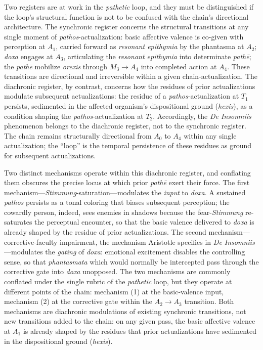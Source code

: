 Two registers are at work in the \textit{pathetic} loop, and they must be distinguished if the loop's structural function is not to be confused with the chain's directional architecture. The synchronic register concerns the structural transitions at any single moment of \textit{pathos}-actualization: basic affective valence is co-given with perception at $A_1$, carried forward as \textit{resonant epithymia} by the phantasma at $A_2$; \textit{doxa} engages at $A_3$, articulating the \textit{resonant epithymia} into determinate \textit{pathē}; the \textit{pathē} mobilize \textit{orexis} through $M_3 \rightarrow A_4$ into completed action at $A_4$. These transitions are directional and irreversible within a given chain-actualization. The diachronic register, by contrast, concerns how the residues of prior actualizations modulate subsequent actualizations: the residue of a \textit{pathos}-actualization at $T_1$ persists, sedimented in the affected organism's dispositional ground (\textit{hexis}), as a condition shaping the \textit{pathos}-actualization at $T_2$. Accordingly, the \textit{De Insomniis} phenomenon belongs to the diachronic register, not to the synchronic register. The chain remains structurally directional from $A_0$ to $A_4$ within any single actualization; the ``loop'' is the temporal persistence of these residues as ground for subsequent actualizations.

Two distinct mechanisms operate within this diachronic register, and conflating them obscures the precise locus at which prior \textit{pathē} exert their force. The first mechanism---\textit{Stimmung}-saturation---modulates the \textit{input} to \textit{doxa}. A sustained \textit{pathos} persists as a tonal coloring that biases subsequent perception; the cowardly person, indeed, sees enemies in shadows because the fear-\textit{Stimmung} re-saturates the perceptual encounter, so that the basic valence delivered to \textit{doxa} is already shaped by the residue of prior actualizations. The second mechanism---corrective-faculty impairment, the mechanism Aristotle specifies in \textit{De Insomniis}---modulates the \textit{gating} of \textit{doxa}: emotional excitement disables the controlling sense, so that \textit{phantasmata} which would normally be intercepted pass through the corrective gate into \textit{doxa} unopposed. The two mechanisms are commonly conflated under the single rubric of the \textit{pathetic} loop, but they operate at different points of the chain: mechanism (1) at the basic-valence input, mechanism (2) at the corrective gate within the $A_2 \rightarrow A_3$ transition. Both mechanisms are diachronic modulations of existing synchronic transitions, not new transitions added to the chain: on any given pass, the basic affective valence at $A_1$ is already shaped by the residues that prior actualizations have sedimented in the dispositional ground (\textit{hexis}).

